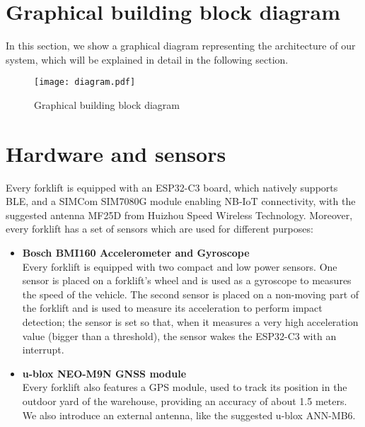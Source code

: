 \section{Graphical building block diagram}
In this section, we show a graphical diagram representing the architecture of our system, which will be explained in detail in the following section.

\begin{figure}[H]
    \centering
    \texttt{[image: diagram.pdf]}
    \caption{Graphical building block diagram}
\end{figure}

\section{Hardware and sensors}
Every forklift is equipped with an ESP32-C3 board, which natively supports BLE, and a SIMCom SIM7080G module enabling NB-IoT connectivity, with the suggested antenna MF25D from Huizhou Speed Wireless Technology. Moreover, every forklift has a set of sensors which are used for different purposes:
\begin{itemize}
\item \textbf{Bosch BMI160 Accelerometer and Gyroscope}\\
Every forklift is equipped with two compact and low power sensors. One sensor is placed on a forklift’s wheel and is used as a gyroscope to measures the speed of the vehicle. The second sensor is placed on a non-moving part of the forklift and is used to measure its acceleration to perform impact detection; the sensor is set so that, when it measures a very high acceleration value (bigger than a threshold), the sensor wakes the ESP32-C3 with an interrupt.
\item \textbf{u-blox NEO-M9N GNSS module}\\
Every forklift also features a GPS module, used to track its position in the outdoor yard of the warehouse, providing an accuracy of about 1.5 meters. We also introduce an external antenna, like the suggested u-blox ANN-MB6.
\end{itemize}


